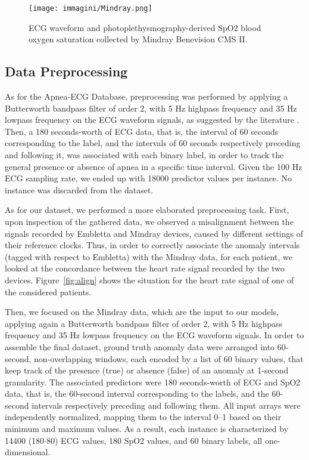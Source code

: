 \documentclass[5p,twocolumn,lefttitle]{elsarticle}
\begin{document}
\begin{figure}[t]
    \centering
    \texttt{[image: immagini/Mindray.png]}
    \caption{ECG waveform and photoplethysmography-derived SpO2 blood oxygen saturation collected by Mindray Benevision CMS II.}
    \label{fig:mindray}
\end{figure}





\subsection{Data Preprocessing}
\label{sec:data_preproc}


As for the Apnea-ECG Database, preprocessing was performed by applying a Butterworth bandpass filter of order 2, with 5 Hz highpass frequency and 35 Hz lowpass frequency on the ECG waveform signals, as suggested by the literature \cite{mostafa2019systematic}. Then, a 180 seconds-worth of ECG data, that is, the interval of 60 seconds corresponding to the label, and the intervals of 60 seconds respectively preceding and following it, was associated with each binary label, in order to track the general presence or absence of apnea in a specific time interval. Given the 100 Hz ECG sampling rate, we ended up with 18000 predictor values per instance. No instance was discarded from the dataset.

As for our dataset, we performed a more elaborated preprocessing task. 
First, upon inspection of the gathered data, we observed a misalignment between the signals recorded by Embletta and Mindray devices, caused by different settings of their reference clocks. Thus, in order to correctly associate the anomaly intervals (tagged with respect to Embletta) with the Mindray data, for each patient, we looked at the concordance between the heart rate signal recorded by the two devices. Figure~\ref{fig:align} shows the situation for the heart rate signal of one of the considered patients.

Then, we focused on the Mindray data, which are the input to our models, applying again a Butterworth bandpass filter of order 2, with 5 Hz highpass frequency and 35 Hz lowpass frequency on the ECG waveform signals. 
In order to assemble the final dataset, ground truth anomaly data were arranged into 60-second, non-overlapping windows, each encoded by a list of 60 binary values, that keep track of the presence (true) or absence (false) of an anomaly at 1-second granularity. The associated predictors were 180 seconds-worth of ECG and SpO2 data, that is, the 60-second interval corresponding to the labels, and the 60-second intervals respectively preceding and following them. 
All input arrays were independently normalized, mapping them to the interval 0--1 based on their minimum and maximum values. As a result, each instance is characterized by 14400 (180$\cdot$80) ECG values, 180 SpO2 values, and 60 binary labels, all one-dimensional.
\end{document}
